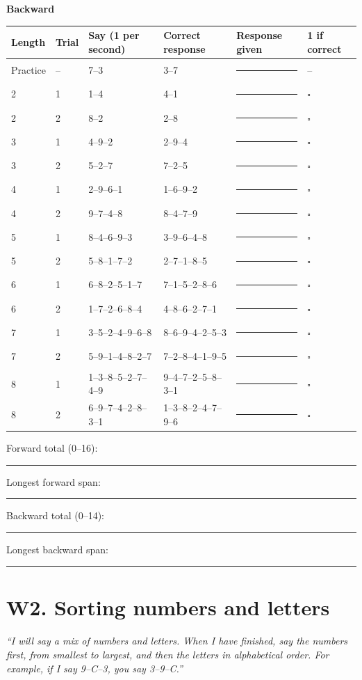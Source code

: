 \documentclass[10pt,a4paper]{article}
\newcommand{\blank}[1][1.2cm]{\rule{#1}{0.4pt}}
\newcommand{\bx}{$\square$}
\begin{document}
\par{}\medskip\textbf{Backward}\par\begin{longtable}{@{}llp{4.2cm}p{4.2cm}p{3.4cm}l@{}}\toprule Length & Trial & Say (1 per second) & Correct response & Response given & 1 if correct\\ \midrule\endhead
Practice & -- & 7--3 & 3--7 & \blank[3.2cm] & --\\ \midrule
2 & 1 & 1--4 & 4--1 & \blank[3.2cm] & \bx\\
2 & 2 & 8--2 & 2--8 & \blank[3.2cm] & \bx\\\midrule
3 & 1 & 4--9--2 & 2--9--4 & \blank[3.2cm] & \bx\\
3 & 2 & 5--2--7 & 7--2--5 & \blank[3.2cm] & \bx\\\midrule
4 & 1 & 2--9--6--1 & 1--6--9--2 & \blank[3.2cm] & \bx\\
4 & 2 & 9--7--4--8 & 8--4--7--9 & \blank[3.2cm] & \bx\\\midrule
5 & 1 & 8--4--6--9--3 & 3--9--6--4--8 & \blank[3.2cm] & \bx\\
5 & 2 & 5--8--1--7--2 & 2--7--1--8--5 & \blank[3.2cm] & \bx\\\midrule
6 & 1 & 6--8--2--5--1--7 & 7--1--5--2--8--6 & \blank[3.2cm] & \bx\\
6 & 2 & 1--7--2--6--8--4 & 4--8--6--2--7--1 & \blank[3.2cm] & \bx\\\midrule
7 & 1 & 3--5--2--4--9--6--8 & 8--6--9--4--2--5--3 & \blank[3.2cm] & \bx\\
7 & 2 & 5--9--1--4--8--2--7 & 7--2--8--4--1--9--5 & \blank[3.2cm] & \bx\\\midrule
8 & 1 & 1--3--8--5--2--7--4--9 & 9--4--7--2--5--8--3--1 & \blank[3.2cm] & \bx\\
8 & 2 & 6--9--7--4--2--8--3--1 & 1--3--8--2--4--7--9--6 & \blank[3.2cm] & \bx\\\midrule
\bottomrule\end{longtable}
Forward total (0--16): \blank \quad Longest forward span: \blank \qquad Backward total (0--14): \blank \quad Longest backward span: \blank
\section*{W2. Sorting numbers and letters}
\textit{``I will say a mix of numbers and letters. When I have finished, say the numbers first, from smallest to largest, and then the letters in alphabetical order. For example, if I say 9--C--3, you say 3--9--C.''}
\end{document}
